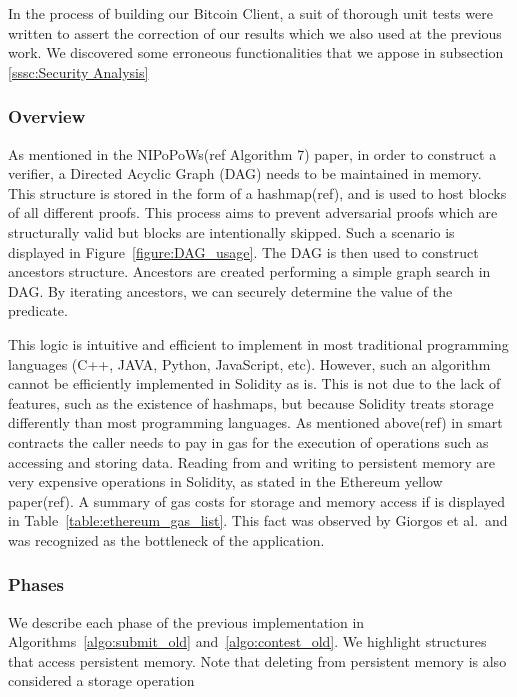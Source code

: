 In the process of building our Bitcoin Client, a suit of thorough unit tests
were written to assert the correction of our results which we also used at the
previous work. We discovered some erroneous functionalities that we appose in
subsection \ref{sssc:Security Analysis}

\subsubsection{Overview} As mentioned in the NIPoPoWs(ref Algorithm 7) paper,
in order to construct a verifier, a Directed Acyclic Graph (DAG) needs to be
maintained in memory. This structure is stored in the form of a hashmap(ref),
and is used to host blocks of all different proofs. This process aims to
prevent adversarial proofs which are structurally valid but blocks are
intentionally skipped. Such a scenario is displayed in
Figure~\ref{figure:DAG_usage}. The DAG is then used to construct ancestors
structure. Ancestors are created performing a simple graph search in DAG. By
iterating ancestors, we can securely determine the value of the predicate.



This logic is intuitive and efficient to implement in most traditional
programming languages (C++, JAVA, Python, JavaScript, etc). However, such an
algorithm cannot be efficiently implemented in Solidity as is. This is not due
to the lack of features, such as the existence of hashmaps, but because
Solidity treats storage differently than most programming languages. As
mentioned above(ref) in smart contracts the caller needs to pay in gas for the
execution of operations such as accessing and storing data. Reading from and
writing to persistent memory are very expensive operations in Solidity, as
stated in the Ethereum yellow paper(ref). A summary of gas costs for storage
and memory access if is displayed in Table~\ref{table:ethereum_gas_list}. This
fact was observed by Giorgos et al.\ and was recognized as the bottleneck of
the application.



\subsubsection{Phases}

We describe each phase of the previous implementation in
Algorithms~\ref{algo:submit_old} and~\ref{algo:contest_old}. We highlight
structures that access persistent memory. Note that deleting from persistent
memory is also considered a storage operation

